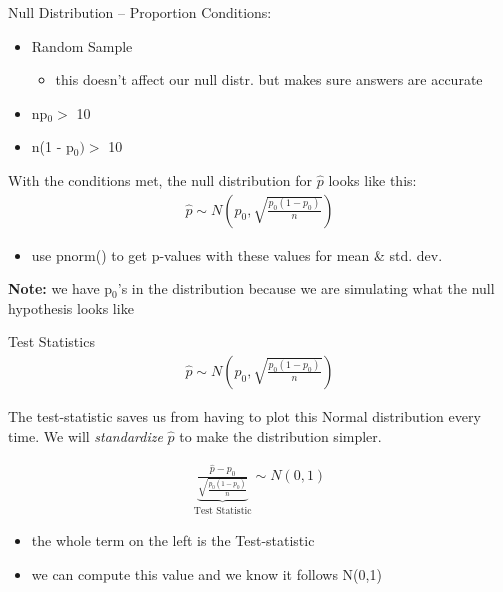 \documentclass{beamer}
\begin{document}
\begin{frame}{Null Distribution -- Proportion}
Conditions:
\begin{itemize}
    \item Random Sample
    \begin{itemize}
        \item this doesn't affect our null distr. but makes sure answers are accurate
    \end{itemize}
    \item np$_0 >$ 10
    \item n(1 - p$_0) >$ 10
\end{itemize} \vspace{4mm}

With the conditions met, the null distribution for $\widehat{p}$ looks like this:
\begin{align*}
    \widehat{p} \sim N(p_0, \sqrt{\frac{p_0(1 - p_0)}{n}})
\end{align*}
\begin{itemize}
    \item use pnorm() to get p-values with these values for mean \& std. dev.
\end{itemize} \vspace{2mm}
\textbf{Note:} we have p$_0$'s in the distribution because we are simulating what the null hypothesis looks like
\end{frame}

\begin{frame}{Test Statistics}
\begin{align*}
    \widehat{p} \sim N(p_0, \sqrt{\frac{p_0(1 - p_0)}{n}})
\end{align*}

The test-statistic saves us from having to plot this Normal distribution every time. We will \textit{standardize} $\hat{p}$ to make the distribution simpler.

\begin{align*}
    \underbrace{\frac{\widehat{p}-p_0}{\sqrt{\frac{p_0(1 - p_0)}{n}}}}_{\text{Test Statistic}} \sim N(0,1)
\end{align*}
\begin{itemize}
    \item the whole term on the left is the Test-statistic
    \item we can compute this value and we know it follows N(0,1)
\end{itemize}
\end{frame}
\end{document}
